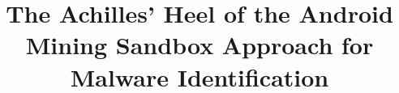 \documentclass[10pt,conference]{IEEEtran}
\begin{document}
\title{The Achilles' Heel of the Android Mining Sandbox Approach for Malware Identification}

% 


\author{

  }

\maketitle



%
%




\balance 



\end{document}
